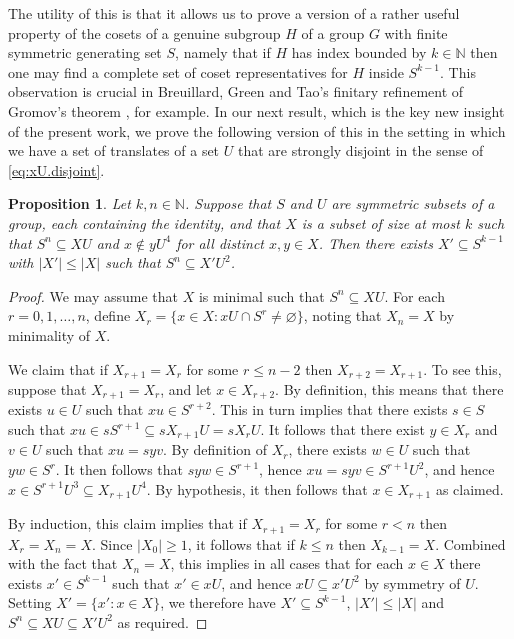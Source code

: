 \documentclass[10pt]{article}
\newcommand{\N}{\mathbb{N}}
\newtheorem{prop}{Proposition}[section]
\begin{document}
The utility of this is that it allows us to prove a version of a rather useful property of the cosets of a genuine subgroup $H$ of a group $G$ with finite symmetric generating set $S$, namely that if $H$ has index bounded by $k\in\N$ then one may find a complete set of coset representatives for $H$ inside $S^{k-1}$. This observation is crucial in Breuillard, Green and Tao's finitary refinement of Gromov's theorem \cite[Corollary 11.2]{bgt}, for example. In our next result, which is the key new insight of the present work, we prove the following version of this in the setting in which we have a set of translates of a set $U$ that are strongly disjoint in the sense of \cref{eq:xU.disjoint}.
\begin{prop}\label{prop:translates.app.grp.bdd.reps}
Let $k,n\in\N$. Suppose that $S$ and $U$ are symmetric subsets of a group, each containing the identity, and that $X$ is a subset of size at most $k$ such that $S^n\subseteq XU$ and $x\notin yU^4$ for all distinct $x,y\in X$. Then there exists $X'\subseteq S^{k-1}$ with $|X'|\le|X|$ such that $S^n\subseteq X'U^2$.
\end{prop}
\begin{proof}
We may assume that $X$ is minimal such that $S^n\subseteq XU$. For each $r=0,1,\ldots,n$, define $X_r=\{x\in X:xU\cap S^r\ne\varnothing\}$, noting that $X_n=X$ by minimality of $X$.

We claim that if $X_{r+1}=X_r$ for some $r\le n-2$ then $X_{r+2}=X_{r+1}$. To see this, suppose that $X_{r+1}=X_r$, and let $x\in X_{r+2}$. By definition, this means that there exists $u\in U$ such that $xu\in S^{r+2}$. This in turn implies that there exists $s\in S$ such that $xu\in sS^{r+1}\subseteq sX_{r+1}U=sX_rU$. It follows that there exist $y\in X_r$ and $v\in U$ such that $xu=syv$. By definition of $X_r$, there exists $w\in U$ such that $yw\in S^r$. It then follows that $syw\in S^{r+1}$, hence $xu=syv\in S^{r+1}U^2$, and hence $x\in S^{r+1}U^3\subseteq X_{r+1}U^4$. By hypothesis, it then follows that $x\in X_{r+1}$ as claimed.

By induction, this claim implies that if $X_{r+1}=X_r$ for some $r< n$ then $X_r=X_n=X$. Since $|X_0|\ge1$, it follows that if $k\le n$ then $X_{k-1}=X$. Combined with the fact that $X_n=X$, this implies in all cases that for each $x\in X$ there exists $x'\in S^{k-1}$ such that $x'\in xU$, and hence $xU\subseteq x'U^2$ by symmetry of $U$. Setting $X'=\{x':x\in X\}$, we therefore have $X'\subseteq S^{k-1}$, $|X'|\le|X|$ and $S^n\subseteq XU\subseteq X'U^2$ as required.
\end{proof}
\end{document}
